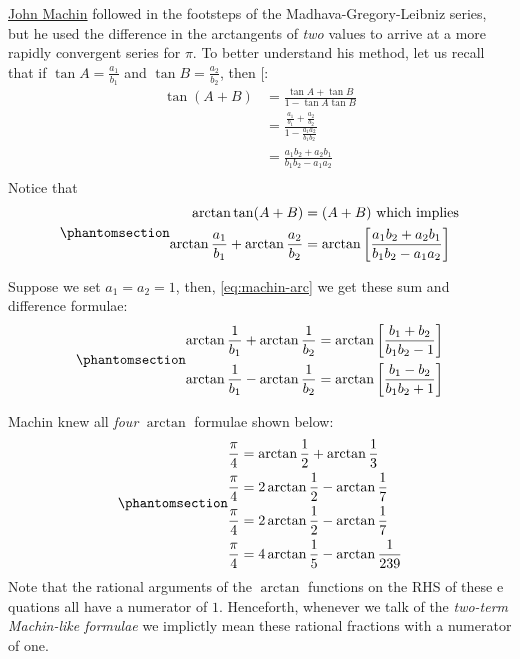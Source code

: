 \documentclass[
  a4paper,
]{article}
\begin{document}
\href{https://en.wikipedia.org/wiki/John_Machin}{John Machin} followed
in the footsteps of the Madhava-Gregory-Leibniz series, but he used the
difference in the arctangents of \emph{two} values to arrive at a more
rapidly convergent series for \(\pi\). To better understand his method,
let us recall that if \(\tan A = \frac{a_1}{b_1}\) and
\(\tan B = \frac{a_2}{b_2}\), then
{[}\citeproc{ref-libre-inv-trig-deriv}{22}{]}: \[
\begin{aligned}
\tan(A + B) &= \frac{\tan A + \tan B}{1 - \tan A\tan B}\\
&= \frac{\frac{a_{1}}{b_{1}} + \frac{a_{2}}{b_{2}}}{1 - \frac{a_{1}a_{2}}{b_{1}b_{2}}}\\
&= \frac{a_{1}b_{2} + a_{2}b_{1}}{b_{1}b_{2} - a_{1}a_{2}}\\
\end{aligned}
\] Notice that \begin{equation}\phantomsection\label{eq:machin-arc}{
\begin{aligned}
\arctan\tan(A+B) &= (A + B) \mbox { which implies}\\
\arctan\frac{a_1}{b_1}  + \arctan\frac{a_2}{b_2} &= \arctan\left[\frac{a_{1}b_{2} + a_{2}b_{1}}{b_{1}b_{2} - a_{1}a_{2}}\right]\\
\end{aligned}
}\end{equation}

Suppose we set \(a_{1} = a_{2} = 1\), then, \cref{eq:machin-arc} we get
these sum and difference formulae:
\begin{equation}\phantomsection\label{eq:sum-diff-arct}{
\begin{aligned}
\arctan\frac{1}{b_1}  + \arctan\frac{1}{b_2} &= \arctan\left[\frac{b_{1} + b_{2}}
{b_{1}b_{2} - 1}\right]\\
\arctan\frac{1}{b_1}  - \arctan\frac{1}{b_2} &= \arctan\left[\frac{b_{1} - b_{2}}
{b_{1}b_{2} + 1}\right]
\end{aligned}
}\end{equation}

Machin knew all \emph{four} \(\arctan\) formulae shown below:
\begin{equation}\phantomsection\label{eq:machin}{
\begin{aligned}
\frac{\pi}{4} &= \arctan\frac{1}{2} + \arctan\frac{1}{3}\\
\frac{\pi}{4} &= 2\arctan\frac{1}{2} - \arctan\frac{1}{7}\\
\frac{\pi}{4} &= 2\arctan\frac{1}{2} - \arctan\frac{1}{7}\\
\frac{\pi}{4} &= 4\arctan\frac{1}{5} - \arctan\frac {1}{239}
\end{aligned}
}\end{equation} Note that the rational arguments of the \(\arctan\)
functions on the RHS of these e quations all have a numerator of \(1\).
Henceforth, whenever we talk of the \emph{two-term Machin-like formulae}
we implictly mean these rational fractions with a numerator of one.
\end{document}
